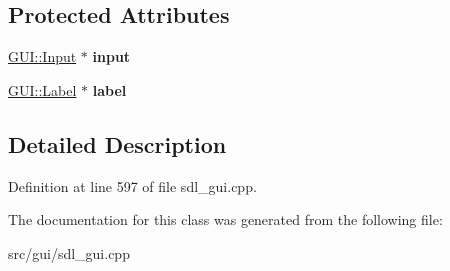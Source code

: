 \subsection*{Protected Attributes}
\begin{DoxyCompactItemize}
\item 
\hypertarget{classPropertyEditorFloat_a84a33b96ef3bd08106b7ab4aa8ef7039}{\hyperlink{classGUI_1_1Input}{G\-U\-I\-::\-Input} $\ast$ {\bfseries input}}\label{classPropertyEditorFloat_a84a33b96ef3bd08106b7ab4aa8ef7039}

\item 
\hypertarget{classPropertyEditorFloat_a6240cde25fd0daa9126b68fff80d3459}{\hyperlink{classGUI_1_1Label}{G\-U\-I\-::\-Label} $\ast$ {\bfseries label}}\label{classPropertyEditorFloat_a6240cde25fd0daa9126b68fff80d3459}

\end{DoxyCompactItemize}


\subsection{Detailed Description}


Definition at line 597 of file sdl\-\_\-gui.\-cpp.



The documentation for this class was generated from the following file\-:\begin{DoxyCompactItemize}
\item 
src/gui/sdl\-\_\-gui.\-cpp\end{DoxyCompactItemize}
